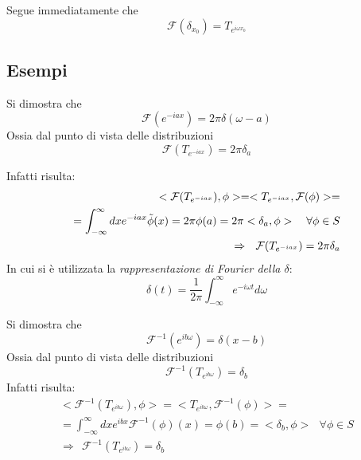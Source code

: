 \documentclass[twoside]{article}
\begin{document}
Segue immediatamente che
\begin{equation}
    \mathcal{F}(\delta_{x_{0}})=T_{e^{i\omega x_0}}
\end{equation}
\subsection{Esempi}


Si dimostra che 
\begin{equation}
    \mathcal{F}(e^{-iax})=2\pi \delta(\omega -a)
\end{equation}
Ossia dal punto di vista delle distribuzioni
\begin{equation}
    \mathcal{F}(T_{e^{-iax}})=2\pi \delta_a
\end{equation}

Infatti risulta:
\begin{equation}\begin{split}
    <\mathcal{F}(T_{e^{-iax}}),\phi>=<T_{e^{-iax}},\mathcal{F}(\phi)>= \\
    =\int_{-\infty}^{\infty}dx e^{-iax}\Tilde{\phi}(x)=2\pi \phi(a)=2\pi <\delta_a,\phi> \ \ \ \forall \phi \in S \\
    \Rightarrow \ \ \mathcal{F}(T_{e^{-iax}})=2\pi \delta_a
\end{split}\end{equation}
In cui si è utilizzata la \textit{rappresentazione di Fourier della $\delta$}:
\begin{equation}
    \delta(t)= \frac{1}{2\pi} \int_{-\infty}^\infty e^{-i\omega t}d\omega
\end{equation}

Si dimostra che 
\begin{equation}
    \mathcal{F}^{-1}(e^{ib\omega})=\delta(x-b)
\end{equation}
Ossia dal punto di vista delle distribuzioni
\begin{equation}
    \mathcal{F}^{-1}(T_{e^{ib\omega}})=\delta_b
\end{equation}
Infatti risulta:
\begin{equation}
    \begin{split}
        <\mathcal{F}^{-1}(T_{e^{ib\omega}}),\phi>=<T_{e^{ib\omega}},\mathcal{F}^{-1}(\phi)>= \\
        =\int_{-\infty}^{\infty}dx e^{ibx}\mathcal{F}^{-1}(\phi)(x)=\phi(b)=<\delta_b,\phi> \ \ \ \forall \phi \in S \\
        \Rightarrow \ \ \mathcal{F}^{-1}(T_{e^{ib\omega}})=\delta_b
    \end{split}
\end{equation}
\end{document}
